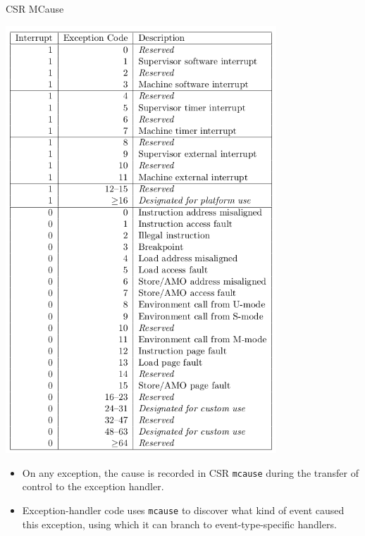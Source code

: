 \documentclass{article}
\newcommand{\hm}{\hspace*{1em}}
\newcommand{\hmm}{\hspace*{2em}}
\begin{document}
\begin{center}
  {\Huge
    CSR MCause}

  \vspace*{0.2in}

  \begin{minipage}[t]{4in}
    \hmm

    \includegraphics[width=4in]{Figs/CSR_MCause.png}
  \end{minipage}
  \hm
  \begin{minipage}[t]{5in}
    \hmm

    \vspace{1in}

    \begin{itemize}\Large
    \item On any exception, the cause is recorded in CSR {\tt mcause}
      during the transfer of control to the exception handler.

    \item Exception-handler code uses {\tt mcause} to discover what kind
      of event caused this exception, using which it can branch to
      event-type-specific handlers.
    \end{itemize}
  \end{minipage}
\end{center}
\end{document}

